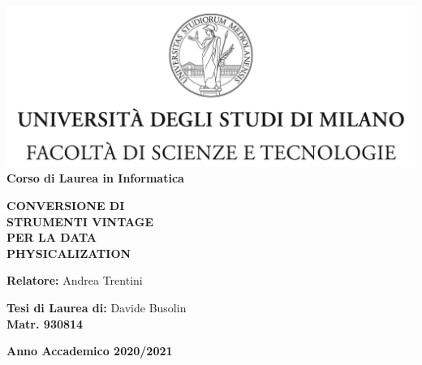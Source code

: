 \documentclass[12pt,a4paper]{report}
\begin{document}
\begin{titlepage}
  \begin{center}
    \includegraphics[width=\textwidth]{Logo.jpg}\\
    {\large{\bf Corso di Laurea in Informatica}}
  \end{center}
  \vspace{12mm}
  \begin{center}
    {\huge{\bf CONVERSIONE DI}}\\
    \vspace{4mm}
    {\huge{\bf STRUMENTI VINTAGE}}\\
    \vspace{4mm}
    {\huge{\bf PER LA DATA}}\\
    \vspace{4mm}
    {\huge{\bf PHYSICALIZATION}}\\
  \end{center}
  \vspace{12mm}
  \begin{flushleft}
    {\large{\bf Relatore:}}
    {\large{Andrea Trentini}}\\
  \end{flushleft}
  \vspace{12mm}
  \begin{flushright}
    {\large{\bf Tesi di Laurea di:}}
    {\large{Davide Busolin}}\\
    {\large{\bf Matr. 930814}}\\
  \end{flushright}
  \vspace{4mm}
  \begin{center}
    {\large{\bf Anno Accademico 2020/2021}}
  \end{center}
\end{titlepage}

\listoftodos
\tableofcontents
\end{document}
